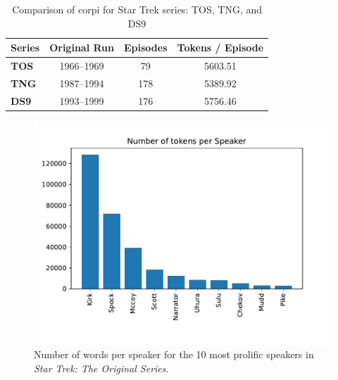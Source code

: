 \begin{table}
  \centering
  \renewcommand*{\arraystretch}{1.4}
  \begin{tabular}{l|c|c|c}
    \textbf{Series} & \textbf{Original Run} & \textbf{Episodes} & \textbf{Tokens / Episode} \\
    \hline
    \textbf{TOS} & 1966--1969 & 79 & 5603.51 \\
    \textbf{TNG} & 1987--1994 & 178 & 5389.92 \\
    \textbf{DS9} & 1993--1999 & 176 & 5756.46 \\
  \end{tabular}
  \caption{Comparison of corpi for Star Trek series: TOS, TNG, and DS9}
  \label{table:series-comparison}
\end{table}

\begin{figure}
  \centering
  \includegraphics[width=\columnwidth]{figures/localized/tos_group_sizes.pdf}
  \caption{Number of words per speaker for the 10 most prolific speakers in \textit{Star Trek: The Original Series}.}
  \label{fig:tos_group_sizes}
\end{figure}

